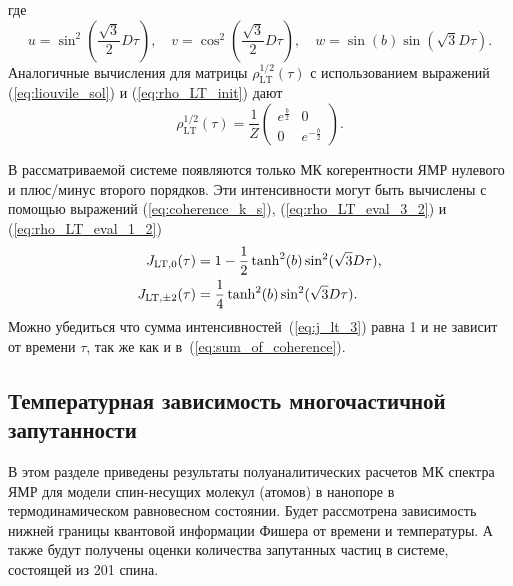 где
\begin{equation}
    u = \sin^2\left(\frac{\sqrt{3}}{2}D\tau\right),
    \quad
    v = \cos^2\left(\frac{\sqrt{3}}{2}D\tau\right),
    \quad
    w = \sin(b)\sin\left(\sqrt{3}D\tau\right).
\end{equation}
%
Аналогичные вычисления для матрицы $\rho^{1/2}_\mathrm{LT} (\tau)$
с использованием выражений (\ref{eq:liouvile_sol}) и (\ref{eq:rho_LT_init})
дают
%
\begin{equation}
\label{eq:rho_LT_eval_1_2}
    \rho_\mathrm{LT}^{1/2}(\tau) = \frac 1 Z
    \begin{pmatrix}
            e^{\frac b 2}
        &
            0
        \\
            0
        &
            e^{-\frac b 2}
    \end{pmatrix}.
\end{equation}

В рассматриваемой системе появляются только МК когерентности ЯМР нулевого и плюс/минус второго порядков.
Эти интенсивности могут быть вычислены с помощью выражений
(\ref{eq:coherence_k_s}), (\ref{eq:rho_LT_eval_3_2}) и (\ref{eq:rho_LT_eval_1_2})
%
\begin{align}\label{eq:j_lt_3}
  J_{\mathrm{LT}, 0}(\tau) & = 1 - \frac 1 2 \tanh^2(b)\sin^2(\sqrt 3 D \tau), \notag \\
  J_{\mathrm{LT},\pm 2}(\tau) & = \frac 1 4 \tanh^2(b)\sin^2(\sqrt 3 D \tau).
\end{align}
%
Можно убедиться что сумма интенсивностей~(\ref{eq:j_lt_3}) равна 1
и не зависит от времени $\tau$, так же как и в~(\ref{eq:sum_of_coherence}).


\subsection{Температурная зависимость многочастичной запутанности}
\label{sec:entanglement}
В этом разделе приведены результаты полуаналитических расчетов МК спектра ЯМР
для модели спин-несущих молекул (атомов) в нанопоре в термодинамическом равновесном состоянии.
Будет рассмотрена зависимость нижней границы квантовой информации Фишера от времени и температуры.
А также будут получены оценки количества запутанных частиц в системе,
состоящей из 201 спина.

